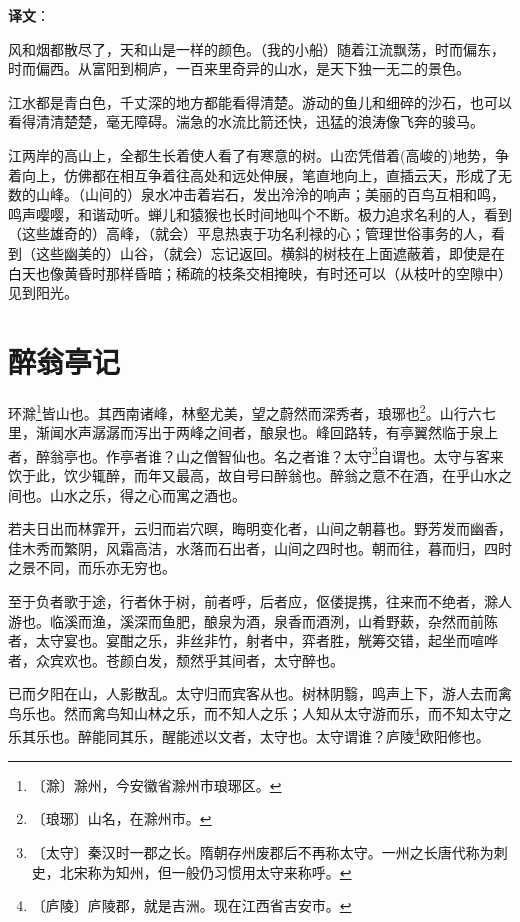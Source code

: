 \documentclass[12pt,UTF-8,openany,a4]{ctexbook}
\begin{document}
\newpage

\begin{Large}
   \noindent \textbf{译文}：
\end{Large}

\vspace{1em}

\begin{large}\yiwen
    
    风和烟都散尽了，天和山是一样的颜色。（我的小船）随着江流飘荡，时而偏东，时而偏西。从富阳到桐庐，一百来里奇异的山水，是天下独一无二的景色。
    
    江水都是青白色，千丈深的地方都能看得清楚。游动的鱼儿和细碎的沙石，也可以看得清清楚楚，毫无障碍。湍急的水流比箭还快，迅猛的浪涛像飞奔的骏马。
    
    江两岸的高山上，全都生长着使人看了有寒意的树。山峦凭借着(高峻的)地势，争着向上，仿佛都在相互争着往高处和远处伸展，笔直地向上，直插云天，形成了无数的山峰。（山间的）泉水冲击着岩石，发出泠泠的响声；美丽的百鸟互相和鸣，鸣声嘤嘤，和谐动听。蝉儿和猿猴也长时间地叫个不断。极力追求名利的人，看到（这些雄奇的）高峰，（就会）平息热衷于功名利禄的心；管理世俗事务的人，看到（这些幽美的）山谷，（就会）忘记返回。横斜的树枝在上面遮蔽着，即使是在白天也像黄昏时那样昏暗；稀疏的枝条交相掩映，有时还可以（从枝叶的空隙中）见到阳光。
    

\end{large}



\chapter{醉翁亭记}

\begin{large}
    
    环滁\footnote{〔滁〕\yiwen 滁州，今安徽省滁州市琅琊区。}皆山也。其西南诸峰，林壑尤美，望之蔚然而深秀者，琅琊也\footnote{〔琅琊〕\yiwen 山名，在滁州市。}。山行六七里，渐闻水声潺潺而泻出于两峰之间者，酿泉也。峰回路转，有亭翼然临于泉上者，醉翁亭也。作亭者谁？山之僧智仙也。名之者谁？太守\footnote{〔太守〕\yiwen 秦汉时一郡之长。隋朝存州废郡后不再称太守。一州之长唐代称为刺史，北宋称为知州，但一般仍习惯用太守来称呼。}自谓也。太守与客来饮于此，饮少辄醉，而年又最高，故自号曰醉翁也。醉翁之意不在酒，在乎山水之间也。山水之乐，得之心而寓之酒也。
    
    若夫日出而林霏开，云归而岩穴暝，晦明变化者，山间之朝暮也。野芳发而幽香，佳木秀而繁阴，风霜高洁，水落而石出者，山间之四时也。朝而往，暮而归，四时之景不同，而乐亦无穷也。
    
    至于负者歌于途，行者休于树，前者呼，后者应，伛偻提携，往来而不绝者，滁人游也。临溪而渔，溪深而鱼肥，酿泉为酒，泉香而酒洌，山肴野蔌，杂然而前陈者，太守宴也。宴酣之乐，非丝非竹，射者中，弈者胜，觥筹交错，起坐而喧哗者，众宾欢也。苍颜白发，颓然乎其间者，太守醉也。
    
    已而夕阳在山，人影散乱。太守归而宾客从也。树林阴翳，鸣声上下，游人去而禽鸟乐也。然而禽鸟知山林之乐，而不知人之乐；人知从太守游而乐，而不知太守之乐其乐也。醉能同其乐，醒能述以文者，太守也。太守谓谁？庐陵\footnote{〔庐陵〕\yiwen 庐陵郡，就是吉洲。现在江西省吉安市。}欧阳修也。

\end{large}
\end{document}
